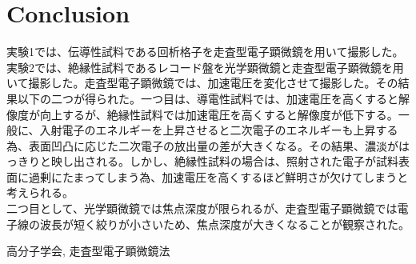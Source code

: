 \documentclass[a4paper,11pt]{jsarticle}
\begin{document}
\section{Conclusion}
実験1では、伝導性試料である回析格子を走査型電子顕微鏡を用いて撮影した。
  実験2では、絶縁性試料であるレコード盤を光学顕微鏡と走査型電子顕微鏡を用いて撮影した。走査型電子顕微鏡では、加速電圧を変化させて撮影した。その結果以下の二つが得られた。一つ目は、導電性試料では、加速電圧を高くすると解像度が向上するが、絶縁性試料では加速電圧を高くすると解像度が低下する。一般に、入射電子のエネルギーを上昇させると二次電子のエネルギーも上昇する為、表面凹凸に応じた二次電子の放出量の差が大きくなる。その結果、濃淡がはっきりと映し出される。しかし、絶縁性試料の場合は、照射された電子が試料表面に過剰にたまってしまう為、加速電圧を高くするほど鮮明さが欠けてしまうと考えられる。\\
  二つ目として、光学顕微鏡では焦点深度が限られるが、走査型電子顕微鏡では電子線の波長が短く絞りが小さいため、焦点深度が大きくなることが観察された。
  
\begin{thebibliography}{文献数}
   高分子学会, 走査型電子顕微鏡法

\end{thebibliography}
\end{document}
